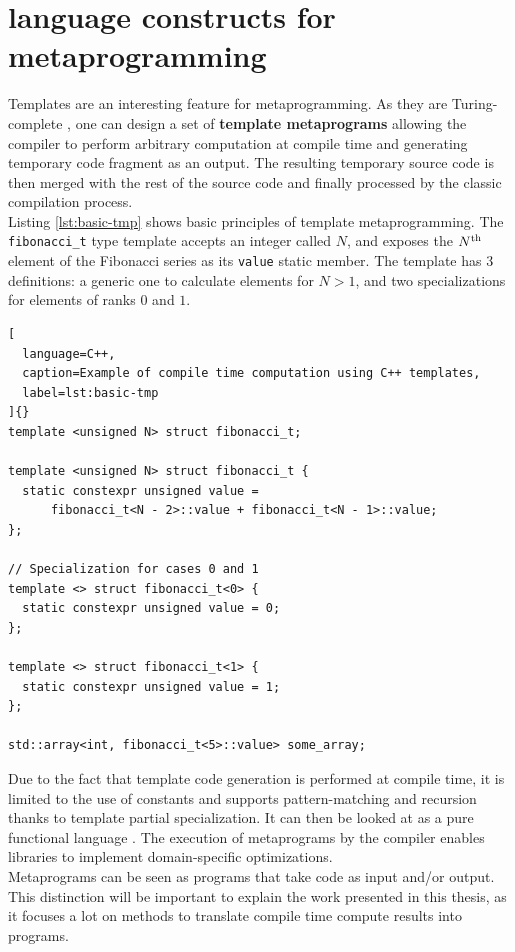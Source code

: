\documentclass[../main]{subfiles}
\begin{document}
\section{
  \cpp language constructs for metaprogramming
}

Templates are an interesting feature for metaprogramming. As they
are Turing-complete \cite{unruh:1994}, one can design a set of
\textbf{template metaprograms} \cite{abrahams:2004} allowing the compiler
to perform arbitrary computation at compile time and generating temporary
\cpp code fragment as an output.
The resulting temporary source code is then
merged with the rest of the source code and finally processed by the classic
compilation process.
\\

Listing \ref{lst:basic-tmp} shows basic principles of \cpp template
metaprogramming. The \lstinline{fibonacci_t} type template accepts an
integer called $N$, and exposes the $N\textsuperscript{th}$ element
of the Fibonacci series as its \lstinline{value} static member.
The template has 3 definitions:
a generic one to calculate elements for $N > 1$,
and two specializations for elements of ranks $0$ and $1$.

\begin{lstlisting}[
  language=C++,
  caption=Example of compile time computation using C++ templates,
  label=lst:basic-tmp
]{}
template <unsigned N> struct fibonacci_t;

template <unsigned N> struct fibonacci_t {
  static constexpr unsigned value =
      fibonacci_t<N - 2>::value + fibonacci_t<N - 1>::value;
};

// Specialization for cases 0 and 1
template <> struct fibonacci_t<0> {
  static constexpr unsigned value = 0;
};

template <> struct fibonacci_t<1> {
  static constexpr unsigned value = 1;
};

std::array<int, fibonacci_t<5>::value> some_array;
\end{lstlisting}

Due to the fact that template code generation is performed at compile time,
it is limited to the use of constants and supports pattern-matching and
recursion thanks to template partial specialization. It can then be looked
at as a pure functional language \cite{haeri:2012}.
The execution of metaprograms by the compiler enables libraries to implement
domain-specific optimizations.
\\

Metaprograms can be seen as programs that take code as input and/or output.
This distinction will be important to explain the work presented in
this thesis, as it focuses a lot on methods to translate
compile time compute results into \cpp programs.
\end{document}
